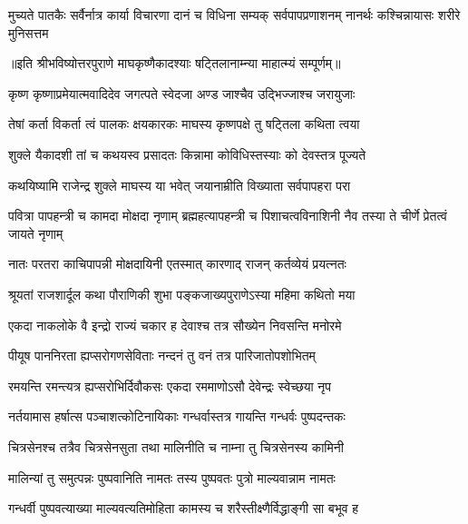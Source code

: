 \threelineshloka
{मुच्यते पातकैः सर्वैर्नात्र कार्या विचारणा}
{दानं च विधिना सम्यक् सर्वपापप्रणाशनम्}
{नानर्थः कश्चिन्नायासः शरीरे मुनिसत्तम} %

॥इति श्रीभविष्योत्तरपुराणे माघकृष्णैकादश्याः षट्तिलानाम्न्या माहात्म्यं सम्पूर्णम्॥


\hyperref[sec:ekadashi_mahatmyam_vrata_raja]{\closesub}
\clearpage

\label{sec:vrata-raja-magha-shukla-jaya}


\twolineshloka
{कृष्ण कृष्णाप्रमेयात्मवादिदेव जगत्पते}
{स्वेदजा अण्ड जाश्चैव उद्भिज्जाश्च जरायुजाः} %

\twolineshloka
{तेषां कर्ता विकर्ता त्वं पालकः क्षयकारकः}
{माघस्य कृष्णपक्षे तु षट्तिला कथिता त्वया} %

\twolineshloka
{शुक्ले यैकादशी तां च कथयस्व प्रसादतः}
{किन्नामा कोविधिस्तस्याः को देवस्तत्र पूज्यते} %


\twolineshloka
{कथयिष्यामि राजेन्द्र शुक्ले माघस्य या भवेत्}
{जयानाम्रीति विख्याता सर्वपापहरा परा} %


\threelineshloka
{पवित्रा पापहन्त्री च कामदा मोक्षदा नृणाम्}
{ब्रह्महत्यापहन्त्री च पिशाचत्वविनाशिनी}
{नैव तस्या ते चीर्णे प्रेतत्वं जायते नृणाम्} %

\twolineshloka
{नातः परतरा काचिपापन्नी मोक्षदायिनी}
{एतस्मात् कारणाद् राजन् कर्तव्येयं प्रयत्नतः} %

\twolineshloka
{श्रूयतां राजशार्दूल कथा पौराणिकी शुभा}
{पङ्कजाख्यपुराणेऽस्या महिमा कथितो मया} %

\twolineshloka
{एकदा नाकलोके वै इन्द्रो राज्यं चकार ह}
{देवाश्च तत्र सौख्येन निवसन्ति मनोरमे} %

\twolineshloka
{पीयूष पाननिरता ह्यप्सरोगणसेविताः}
{नन्दनं तु वनं तत्र पारिजातोपशोभितम्} %

\twolineshloka
{रमयन्ति रमन्त्यत्र ह्यप्सरोभिर्दिवौकसः}
{एकदा रममाणोऽसौ देवेन्द्रः स्वेच्छया नृप} %

\twolineshloka
{नर्तयामास हर्षात्स पञ्चाशत्कोटिनायिकाः}
{गन्धर्वास्तत्र गायन्ति गन्धर्वः पुष्पदन्तकः} %

\twolineshloka
{चित्रसेनश्च तत्रैव चित्रसेनसुता तथा}
{मालिनीति च नाम्ना तु चित्रसेनस्य कामिनी} %

\twolineshloka
{मालिन्यां तु समुत्पन्नः पुष्पवानिति नामतः}
{तस्य पुष्पवतः पुत्रो माल्यवान्नाम नामतः} %

\twolineshloka
{गन्धर्वी पुष्पवत्याख्या माल्यवत्यतिमोहिता}
{कामस्य च शरैस्तीक्ष्णैर्विद्धाङ्गी सा बभूव ह} %

